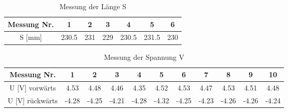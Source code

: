 \documentclass[a4paper,parskip,11pt, DIV12]{scrreprt}
\begin{document}
	\begin{table}[H]
	\begin{tabular}{|c|c|c|c|c|c|c|}
	\hline 
Messung Nr.	&	1	&	2	&	3	&	4	&	5	&	6	\\
\hline
S [mm]	&	230.5	&	231	&	229	&	230.5	&	231.5	&	230	\\
	\hline
	\end{tabular} 
	\caption{Messung der Länge S}
	\end{table}
	
	\begin{table}[H]
	\begin{tabular}{|c|c|c|c|c|c|c|c|c|c|c|}
	\hline 
Messung Nr.	&	1	&	2	&	3	&	4	&	5	&	6	&	7	&	8	&	9	&	10	\\
\hline
U [V] vorwärts	&	4.53	&	4.48	&	4.46	&	4.35	&	4.52	&	4.53	&	4.47	&	4.53	&	4.51	&	4.48	\\
\hline
U [V] rückwärts	&	-4.28	&	-4.25	&	-4.21	&	-4.28	&	-4.32	&	-4.25	&	-4.23	&	-4.26	&	-4.26	&	-4.24	\\
	\hline
	\end{tabular} 
	\caption{Messung der Spannung V}
	\end{table}
\end{document}
